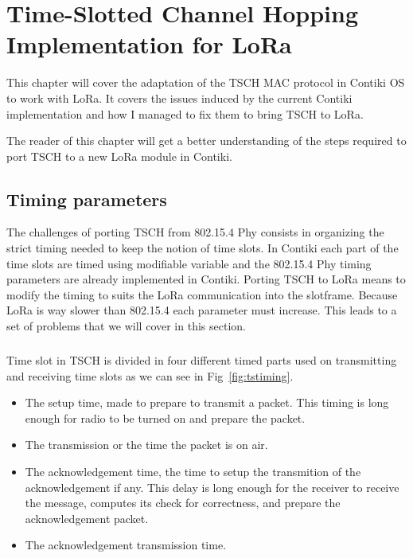 \chapter{Time-Slotted Channel Hopping Implementation for LoRa\label{section:tsch}}

This chapter will cover the adaptation of the TSCH MAC protocol in Contiki OS to
work with LoRa.
It covers the issues induced by the current Contiki implementation and how I
managed to fix them to bring TSCH to LoRa.

The reader of this chapter will get a better understanding of the steps
required to port TSCH to a new LoRa module in Contiki.

\section{Timing parameters\label{section:timingparameters}}

The challenges of porting TSCH from 802.15.4 Phy consists in organizing
the strict timing needed to keep the notion of time slots.
In Contiki each part of the time slots are timed using modifiable
variable and the 802.15.4 Phy timing parameters are already
implemented in Contiki.
Porting TSCH to LoRa means to modify the timing to suits the LoRa communication
into the slotframe.
Because LoRa is way slower than 802.15.4 each parameter must increase.
This leads to a set of problems that we will cover in this section.

\paragraph{}

Time slot in TSCH is divided in four different timed parts used on
transmitting and receiving time slots as we can see in Fig~\ref{fig:tstiming}.

\begin{itemize}
  \item The setup time, made to prepare to transmit a packet.
    This timing is long enough for radio to be turned on and prepare the packet.
  \item The transmission or the time the packet is on air.
  \item The acknowledgement time, the time to setup the transmition of the
    acknowledgement if any.
    This delay is long enough for the receiver to receive the message,
    computes its check for correctness, and prepare the acknowledgement packet.
  \item The acknowledgement transmission time.
\end{itemize}

